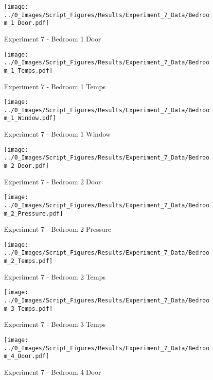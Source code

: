 	\begin{figure}[H]
		\centering
		\texttt{[image: ../0\_Images/Script\_Figures/Results/Experiment\_7\_Data/Bedroom\_1\_Door.pdf]}
		\caption[]{Experiment 7 - Bedroom 1 Door}
	\end{figure}
 

	\begin{figure}[H]
		\centering
		\texttt{[image: ../0\_Images/Script\_Figures/Results/Experiment\_7\_Data/Bedroom\_1\_Temps.pdf]}
		\caption[]{Experiment 7 - Bedroom 1 Temps}
	\end{figure}
 
	\clearpage

	\begin{figure}[H]
		\centering
		\texttt{[image: ../0\_Images/Script\_Figures/Results/Experiment\_7\_Data/Bedroom\_1\_Window.pdf]}
		\caption[]{Experiment 7 - Bedroom 1 Window}
	\end{figure}
 

	\begin{figure}[H]
		\centering
		\texttt{[image: ../0\_Images/Script\_Figures/Results/Experiment\_7\_Data/Bedroom\_2\_Door.pdf]}
		\caption[]{Experiment 7 - Bedroom 2 Door}
	\end{figure}
 
	\clearpage

	\begin{figure}[H]
		\centering
		\texttt{[image: ../0\_Images/Script\_Figures/Results/Experiment\_7\_Data/Bedroom\_2\_Pressure.pdf]}
		\caption[]{Experiment 7 - Bedroom 2 Pressure}
	\end{figure}
 

	\begin{figure}[H]
		\centering
		\texttt{[image: ../0\_Images/Script\_Figures/Results/Experiment\_7\_Data/Bedroom\_2\_Temps.pdf]}
		\caption[]{Experiment 7 - Bedroom 2 Temps}
	\end{figure}
 
	\clearpage

	\begin{figure}[H]
		\centering
		\texttt{[image: ../0\_Images/Script\_Figures/Results/Experiment\_7\_Data/Bedroom\_3\_Temps.pdf]}
		\caption[]{Experiment 7 - Bedroom 3 Temps}
	\end{figure}
 

	\begin{figure}[H]
		\centering
		\texttt{[image: ../0\_Images/Script\_Figures/Results/Experiment\_7\_Data/Bedroom\_4\_Door.pdf]}
		\caption[]{Experiment 7 - Bedroom 4 Door}
	\end{figure}
 
